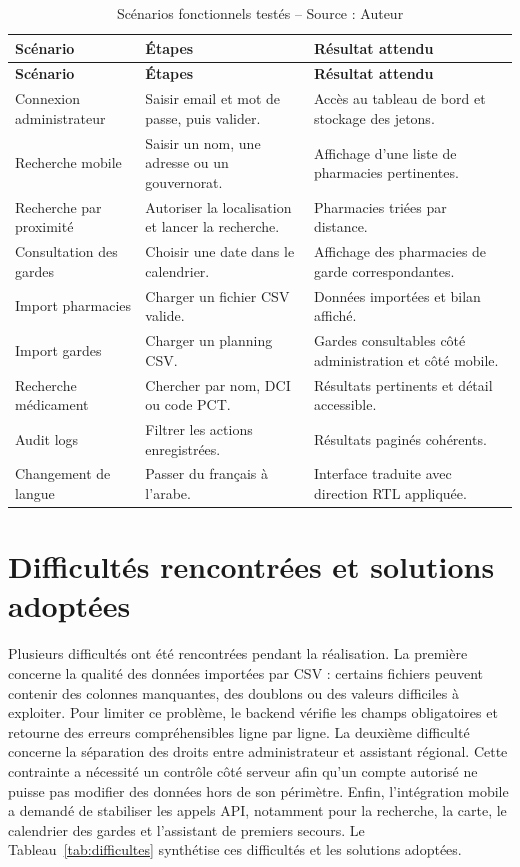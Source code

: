 \begin{longtable}{L{4cm}L{5cm}L{5cm}}
    \caption{Scénarios fonctionnels testés -- Source : Auteur}\label{tab:scenarios-tests}\\
    \toprule
    \textbf{Scénario} & \textbf{Étapes} & \textbf{Résultat attendu} \\
    \midrule
    \endfirsthead
    \toprule
    \textbf{Scénario} & \textbf{Étapes} & \textbf{Résultat attendu} \\
    \midrule
    \endhead
    Connexion administrateur & Saisir email et mot de passe, puis valider. & Accès au tableau de bord et stockage des jetons. \\
    Recherche mobile & Saisir un nom, une adresse ou un gouvernorat. & Affichage d'une liste de pharmacies pertinentes. \\
    Recherche par proximité & Autoriser la localisation et lancer la recherche. & Pharmacies triées par distance. \\
    Consultation des gardes & Choisir une date dans le calendrier. & Affichage des pharmacies de garde correspondantes. \\
    Import pharmacies & Charger un fichier CSV valide. & Données importées et bilan affiché. \\
    Import gardes & Charger un planning CSV. & Gardes consultables côté administration et côté mobile. \\
    Recherche médicament & Chercher par nom, DCI ou code PCT. & Résultats pertinents et détail accessible. \\
    Audit logs & Filtrer les actions enregistrées. & Résultats paginés cohérents. \\
    Changement de langue & Passer du français à l'arabe. & Interface traduite avec direction RTL appliquée. \\
    \bottomrule
\end{longtable}

\section{Difficultés rencontrées et solutions adoptées}

Plusieurs difficultés ont été rencontrées pendant la réalisation. La première concerne la qualité des données
importées par CSV : certains fichiers peuvent contenir des colonnes manquantes, des doublons ou des valeurs
difficiles à exploiter. Pour limiter ce problème, le backend vérifie les champs obligatoires et retourne des
erreurs compréhensibles ligne par ligne. La deuxième difficulté concerne la séparation des droits entre
administrateur et assistant régional. Cette contrainte a nécessité un contrôle côté serveur afin qu'un compte
autorisé ne puisse pas modifier des données hors de son périmètre. Enfin, l'intégration mobile a demandé de
stabiliser les appels API, notamment pour la recherche, la carte, le calendrier des gardes et l'assistant de
premiers secours. Le Tableau~\ref{tab:difficultes} synthétise ces difficultés et les solutions adoptées.

